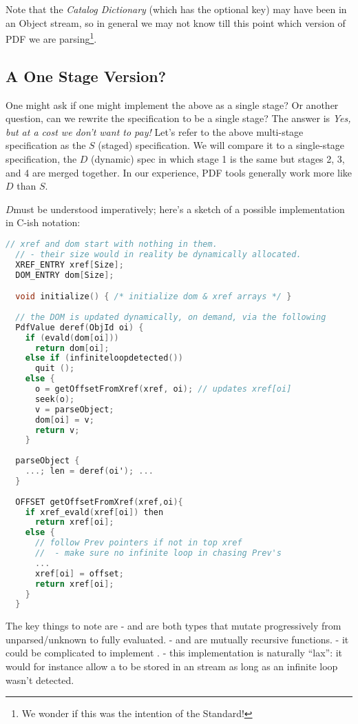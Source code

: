Note that the \emph{Catalog Dictionary} (which has the optional
 key) may have been in an Object stream, so in general
we may not know till this point which version of PDF we are
parsing\footnote{We wonder if this was the intention of the Standard!}.

\subsection{A One Stage Version?}
\label{sec:single-pass-problems}

\newcommand{\ssp}{$S$}
\newcommand{\dsp}{$D$}

One might ask if one might implement the above as a single stage?
Or another question, can we rewrite the specification to be a single stage?
The answer is \emph{Yes, but at a cost we don't want to pay!}
Let's refer to the above multi-stage specification as the \ssp{}
(staged) specification.
%
We will compare it to a single-stage specification, the \dsp{}
(dynamic) spec in which stage 1 is the same but stages 2, 3, and 4 are
merged together.
%
In our experience, PDF tools generally work more like \dsp{} than \ssp{}.

\dsp must be understood imperatively; here's a sketch of a possible
implementation in C-ish notation:
\begin{lstlisting}[language=C]
  // xref and dom start with nothing in them.
  // - their size would in reality be dynamically allocated.
  XREF_ENTRY xref[Size];     
  DOM_ENTRY dom[Size];

  void initialize() { /* initialize dom & xref arrays */ }
  
  // the DOM is updated dynamically, on demand, via the following
  PdfValue deref(ObjId oi) {
    if (evald(dom[oi]))
      return dom[oi];
    else if (infiniteloopdetected())
      quit ();      
    else {
      o = getOffsetFromXref(xref, oi); // updates xref[oi]
      seek(o);
      v = parseObject;
      dom[oi] = v;
      return v;
    }
    
  parseObject {
    ...; len = deref(oi'); ...
  }
  
  OFFSET getOffsetFromXref(xref,oi){
    if xref_evald(xref[oi]) then
      return xref[oi];
    else {
      // follow Prev pointers if not in top xref
      //  - make sure no infinite loop in chasing Prev's
      ...
      xref[oi] = offset;
      return xref[oi];
    }
  }
\end{lstlisting}
The key things to note are
 -  and  are both types that mutate progressively
   from unparsed/unknown to fully evaluated.
 -  and  are mutually recursive functions.
 - it could be complicated to implement .
 - this implementation is naturally ``lax'': it would for instance
   allow a  to be stored in an  stream as
   long as an infinite loop wasn't detected.
   
